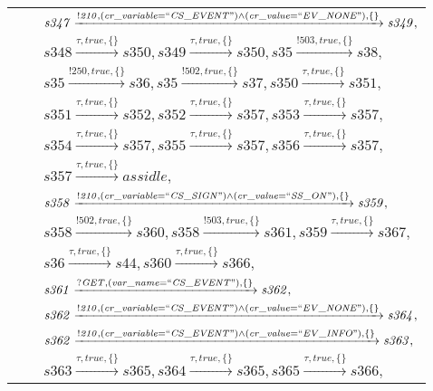 \begin{tabular}{lcp{350px}}
& & $\mathit{s347}\xrightarrow{\mathit{!210}, \mathit{(cr\_variable = ``CS\_EVENT") \land (cr\_value = ``EV\_NONE")}, \{\}}\mathit{s349},$ \\
& & $\mathit{s348}\xrightarrow{\mathit{\tau}, \mathit{true}, \{\}}\mathit{s350},\mathit{s349}\xrightarrow{\mathit{\tau}, \mathit{true}, \{\}}\mathit{s350},\mathit{s35}\xrightarrow{\mathit{!503}, \mathit{true}, \{\}}\mathit{s38},$ \\
& & $\mathit{s35}\xrightarrow{\mathit{!250}, \mathit{true}, \{\}}\mathit{s36},\mathit{s35}\xrightarrow{\mathit{!502}, \mathit{true}, \{\}}\mathit{s37},\mathit{s350}\xrightarrow{\mathit{\tau}, \mathit{true}, \{\}}\mathit{s351},$ \\
& & $\mathit{s351}\xrightarrow{\mathit{\tau}, \mathit{true}, \{\}}\mathit{s352},\mathit{s352}\xrightarrow{\mathit{\tau}, \mathit{true}, \{\}}\mathit{s357},\mathit{s353}\xrightarrow{\mathit{\tau}, \mathit{true}, \{\}}\mathit{s357},$ \\
& & $\mathit{s354}\xrightarrow{\mathit{\tau}, \mathit{true}, \{\}}\mathit{s357},\mathit{s355}\xrightarrow{\mathit{\tau}, \mathit{true}, \{\}}\mathit{s357},\mathit{s356}\xrightarrow{\mathit{\tau}, \mathit{true}, \{\}}\mathit{s357},$ \\
& & $\mathit{s357}\xrightarrow{\mathit{\tau}, \mathit{true}, \{\}}\mathit{assidle},$ \\
& & $\mathit{s358}\xrightarrow{\mathit{!210}, \mathit{(cr\_variable = ``CS\_SIGN") \land (cr\_value = ``SS\_ON")}, \{\}}\mathit{s359},$ \\
& & $\mathit{s358}\xrightarrow{\mathit{!502}, \mathit{true}, \{\}}\mathit{s360},\mathit{s358}\xrightarrow{\mathit{!503}, \mathit{true}, \{\}}\mathit{s361},\mathit{s359}\xrightarrow{\mathit{\tau}, \mathit{true}, \{\}}\mathit{s367},$ \\
& & $\mathit{s36}\xrightarrow{\mathit{\tau}, \mathit{true}, \{\}}\mathit{s44},\mathit{s360}\xrightarrow{\mathit{\tau}, \mathit{true}, \{\}}\mathit{s366},$ \\
& & $\mathit{s361}\xrightarrow{\mathit{?GET}, \mathit{(var\_name = ``CS\_EVENT")}, \{\}}\mathit{s362},$ \\
& & $\mathit{s362}\xrightarrow{\mathit{!210}, \mathit{(cr\_variable = ``CS\_EVENT") \land (cr\_value = ``EV\_NONE")}, \{\}}\mathit{s364},$ \\
& & $\mathit{s362}\xrightarrow{\mathit{!210}, \mathit{(cr\_variable = ``CS\_EVENT") \land (cr\_value = ``EV\_INFO")}, \{\}}\mathit{s363},$ \\
& & $\mathit{s363}\xrightarrow{\mathit{\tau}, \mathit{true}, \{\}}\mathit{s365},\mathit{s364}\xrightarrow{\mathit{\tau}, \mathit{true}, \{\}}\mathit{s365},\mathit{s365}\xrightarrow{\mathit{\tau}, \mathit{true}, \{\}}\mathit{s366},$ \\

\end{tabular}
